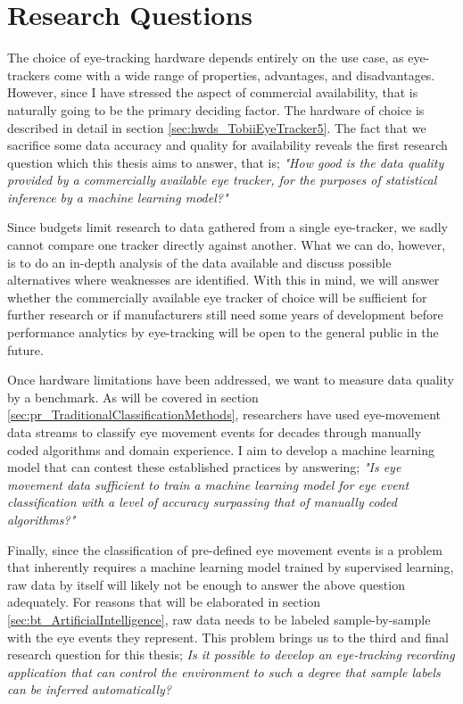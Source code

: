 \section{Research Questions} \label{sec:intro_research}

The choice of eye-tracking hardware depends entirely on the use case, as eye-trackers come with a wide range of properties, advantages, and disadvantages. However, since I have stressed the aspect of commercial availability, that is naturally going to be the primary deciding factor. The hardware of choice is described in detail in section \ref{sec:hwds_TobiiEyeTracker5}. The fact that we sacrifice some data accuracy and quality for availability reveals the first research question which this thesis aims to answer, that is; \textit{"How good is the data quality provided by a commercially available eye tracker, for the purposes of statistical inference by a machine learning model?"}

Since budgets limit research to data gathered from a single eye-tracker, we sadly cannot compare one tracker directly against another. What we can do, however, is to do an in-depth analysis of the data available and discuss possible alternatives where weaknesses are identified. With this in mind, we will answer whether the commercially available eye tracker of choice will be sufficient for further research or if manufacturers still need some years of development before performance analytics by eye-tracking will be open to the general public in the future.

Once hardware limitations have been addressed, we want to measure data quality by a benchmark. As will be covered in section \ref{sec:pr_TraditionalClassificationMethods}, researchers have used eye-movement data streams to classify eye movement events for decades through manually coded algorithms and domain experience. I aim to develop a machine learning model that can contest these established practices by answering; \textit{"Is eye movement data sufficient to train a machine learning model for eye event classification with a level of accuracy surpassing that of manually coded algorithms?"} 

Finally, since the classification of pre-defined eye movement events is a problem that inherently requires a machine learning model trained by supervised learning, raw data by itself will likely not be enough to answer the above question adequately. For reasons that will be elaborated in section \ref{sec:bt_ArtificialIntelligence}, raw data needs to be labeled sample-by-sample with the eye events they represent. This problem brings us to the third and final research question for this thesis; \textit{Is it possible to develop an eye-tracking recording application that can control the environment to such a degree that sample labels can be inferred automatically?} 

